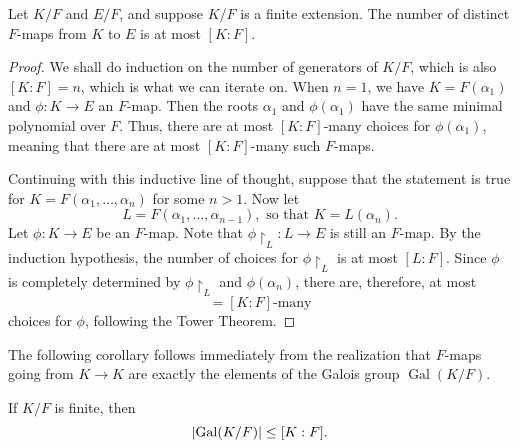 \documentclass[notoc,notitlepage,nobib]{tufte-book}
\DeclareMathOperator{\Gal}{Gal}
\begin{document}
\begin{lemma}\label{lemma:number_of_distinct_f_maps}
  Let $K / F$ and $E / F$, and suppose $K / F$ is a finite extension. The number
  of distinct $F$-maps from $K$ to $E$ is at most $[K : F]$.
\end{lemma}

\begin{proof}
  We shall do induction on the number of generators of $K / F$, which is also
  $[ K : F ] = n$, which is what we can iterate on. When $n = 1$, we have $K =
  F(\alpha_1)$ and $\phi : K \to E$ an $F$-map. Then the roots $\alpha_1$ and
  $\phi(\alpha_1)$ have the same minimal polynomial 
  over $F$. Thus, there are at most $[ K : F ]$-many choices for
  $\phi(\alpha_1)$, meaning that there are at most $[ K : F ]$-many such
  $F$-maps.

  Continuing with this inductive line of thought, suppose that the statement is
  true for $K = F(\alpha_1, \ldots, \alpha_n)$ for some $n > 1$. Now let
  \begin{equation*}
    L = F(\alpha_1, \ldots, \alpha_{n - 1}), \text{ so that } K = L(\alpha_n).
  \end{equation*}
  Let $\phi : K \to E$ be an $F$-map. Note that $\phi \restriction_L : L \to E$
  is still an $F$-map. By the induction hypothesis, the number of choices for
  $\phi \restriction_L$ is at most $[ L : F ]$. Since $\phi$ is completely
  determined by $\phi \restriction_L$ and $\phi(\alpha_n)$, there are,
  therefore, at most
  \begin{equation*}
    [L : F][ L(\alpha_n) : L ] = [ K : F ]\text{-many}
  \end{equation*}
  choices for $\phi$, following the Tower Theorem.
\end{proof}

The following corollary follows immediately from the realization that $F$-maps
going from $K \to K$ are exactly the elements of the Galois group $\Gal(K / F)$.

\begin{crly}\label{crly:upper_bound_for_the_galois_group_of_finite_extensions}
  If $K / F$ is finite, then
  \begin{equation*}
    \abs{ \Gal(K / F) } \leq [ K : F ].
  \end{equation*}
\end{crly}
\end{document}
